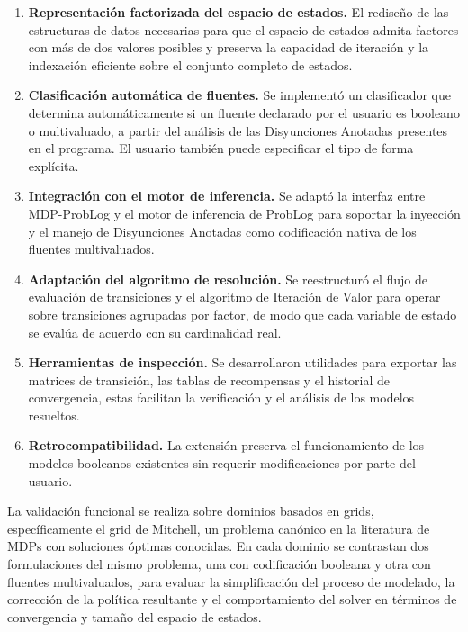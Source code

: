 \begin{enumerate}
    \item \textbf{Representación factorizada del espacio de estados.}
    El rediseño de las estructuras de datos necesarias para que el espacio de estados admita factores con más de dos valores posibles y preserva la capacidad de iteración y la indexación eficiente sobre el conjunto completo de estados.

    \item \textbf{Clasificación automática de fluentes.} Se implementó un clasificador que determina automáticamente si un fluente declarado por el usuario es booleano o multivaluado, a partir del análisis de las Disyunciones Anotadas presentes en el programa. El usuario también puede especificar el tipo de forma explícita.

    \item \textbf{Integración con el motor de inferencia.} Se adaptó la interfaz entre MDP-ProbLog y el motor de inferencia de ProbLog para soportar la inyección y el manejo de Disyunciones Anotadas como codificación nativa de los fluentes multivaluados.

    \item \textbf{Adaptación del algoritmo de resolución.} Se reestructuró el flujo de evaluación de transiciones y el algoritmo de Iteración de Valor para operar sobre transiciones agrupadas por factor, de modo que cada variable de estado se evalúa de acuerdo con su cardinalidad real.

    \item \textbf{Herramientas de inspección.} Se desarrollaron utilidades para exportar las matrices de transición, las tablas de recompensas y el historial de convergencia, estas facilitan la verificación y el análisis de los modelos resueltos.

    \item \textbf{Retrocompatibilidad.} La extensión preserva el funcionamiento de los modelos booleanos existentes sin requerir modificaciones por parte del usuario.
\end{enumerate}

La validación funcional se realiza sobre dominios basados en grids, específicamente el grid de Mitchell, un problema canónico en la literatura de MDPs con soluciones óptimas conocidas. En cada dominio se contrastan dos formulaciones del mismo problema, una con codificación booleana y otra con fluentes multivaluados, para evaluar la simplificación del proceso de modelado, la corrección de la política resultante y el comportamiento del solver en términos de convergencia y tamaño del espacio de estados.

